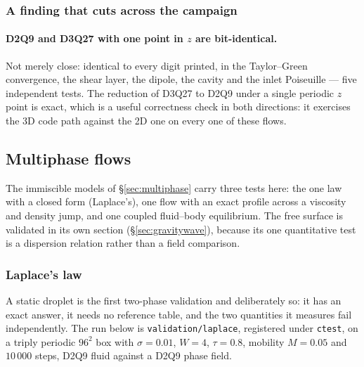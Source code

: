\documentclass[11pt,a4paper]{article}
\newcommand{\code}[1]{\texttt{\small #1}}
\begin{document}
\subsubsection{A finding that cuts across the campaign}

\paragraph{D2Q9 and D3Q27 with one point in $z$ are bit-identical.} Not merely
close: identical to every digit printed, in the Taylor--Green convergence, the
shear layer, the dipole, the cavity and the inlet Poiseuille --- five
independent tests. The reduction of D3Q27 to D2Q9 under a single periodic $z$
point is exact, which is a useful correctness check in both directions: it
exercises the 3D code path against the 2D one on every one of these flows.


\subsection{Multiphase flows}
\label{sec:val:multi}

The immiscible models of \S\ref{sec:multiphase} carry three tests here: the one
law with a closed form (Laplace's), one flow with an exact profile across a
viscosity and density jump, and one coupled fluid--body equilibrium. The free
surface is validated in its own section (\S\ref{sec:gravitywave}), because its
one quantitative test is a dispersion relation rather than a field comparison.
\subsubsection{Laplace's law}
\label{sec:laplace}

A static droplet is the first two-phase validation and deliberately so: it has an
exact answer, it needs no reference table, and the two quantities it measures
fail independently. The run below is \code{validation/laplace}, registered under
\code{ctest}, on a triply periodic $96^2$ box with $\sigma=0.01$, $W=4$,
$\tau=0.8$, mobility $M=0.05$ and $10\,000$ steps, D2Q9 fluid against a D2Q9
phase field.
\end{document}
